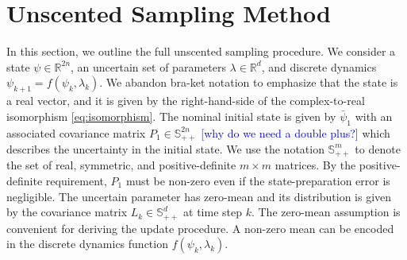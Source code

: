 \section{Unscented Sampling Method}
\label{appendix:unscented}
In this section, we outline the full unscented sampling procedure.
We consider a state $\psi \in \mathbb{R}^{2n}$, 
an uncertain set of parameters $\lambda\in \mathbb{R}^{d}$, and discrete dynamics
$\psi_{k + 1} = f(\psi_{k}, \lambda_{k})$.
We abandon bra-ket notation to emphasize that
the state is a real vector, and it is given by the right-hand-side of the
complex-to-real isomorphism \eqref{eq:isomorphism}.
The nominal initial state is given by $\bar{\psi}_{1}$ with an associated
covariance matrix $P_{1} \in \mathbb{S}_{++}^{2n}$ \textcolor{blue}{[why do we need a double plus?]}
which describes the uncertainty in the initial state.
We use the notation $\mathbb{S}_{++}^{m}$ to denote the
set of real, symmetric, and positive-definite $m \times m$ matrices.
By the positive-definite requirement, $P_{1}$ must be non-zero even if the state-preparation error
is negligible.
The uncertain parameter has zero-mean
and its distribution is given by the covariance matrix
$L_{k} \in \mathbb{S}_{++}^{d}$ at time step $k$. The zero-mean assumption
is convenient for deriving the update procedure. A non-zero mean can be encoded
in the discrete dynamics function $f(\psi_{k}, \lambda_{k})$.

